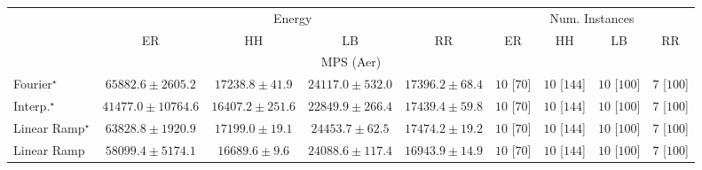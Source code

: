 \begin{tabular}{l|cccc|cccc|}
\toprule
& \multicolumn{4}{c|}{Energy} & \multicolumn{4}{c|}{Num. Instances} \\
            & ER & HH & LB & RR & ER & HH & LB & RR \\
\midrule
\multicolumn{9}{c}{\rule{0pt}{8pt}MPS (Aer)} \\
\midrule
Fourier$^\star$ & {\cellcolor[HTML]{84248A}} \color[HTML]{F1F1F1} $65882.6\pm 2605.2$ & {\cellcolor[HTML]{BED2E6}} \color[HTML]{000000} $17238.8\pm 41.9$ & {\cellcolor[HTML]{A8C3DE}} \color[HTML]{000000} $24117.0\pm 532.0$ & {\cellcolor[HTML]{BDD1E5}} \color[HTML]{000000} $17396.2\pm 68.4$ & {\cellcolor[HTML]{49006A}} \color[HTML]{F1F1F1} $10$ [$70$] & {\cellcolor[HTML]{49006A}} \color[HTML]{F1F1F1} $10$ [$144$] & {\cellcolor[HTML]{49006A}} \color[HTML]{F1F1F1} $10$ [$100$] & {\cellcolor[HTML]{FFF7F3}} \color[HTML]{000000} $7$ [$100$] \\
Interp.$^\star$ & {\cellcolor[HTML]{8C89C0}} \color[HTML]{F1F1F1} $41477.0\pm 10764.6$ & {\cellcolor[HTML]{C0D4E6}} \color[HTML]{000000} $16407.2\pm 251.6$ & {\cellcolor[HTML]{ACC6DF}} \color[HTML]{000000} $22849.9\pm 266.4$ & {\cellcolor[HTML]{BDD1E5}} \color[HTML]{000000} $17439.4\pm 59.8$ & {\cellcolor[HTML]{49006A}} \color[HTML]{F1F1F1} $10$ [$70$] & {\cellcolor[HTML]{49006A}} \color[HTML]{F1F1F1} $10$ [$144$] & {\cellcolor[HTML]{49006A}} \color[HTML]{F1F1F1} $10$ [$100$] & {\cellcolor[HTML]{FFF7F3}} \color[HTML]{000000} $7$ [$100$] \\
Linear Ramp$^\star$ & {\cellcolor[HTML]{852D90}} \color[HTML]{F1F1F1} $63828.8\pm 1920.9$ & {\cellcolor[HTML]{BED2E6}} \color[HTML]{000000} $17199.0\pm 19.1$ & {\cellcolor[HTML]{A7C2DD}} \color[HTML]{000000} $24453.7\pm 62.5$ & {\cellcolor[HTML]{BDD1E5}} \color[HTML]{000000} $17474.2\pm 19.2$ & {\cellcolor[HTML]{49006A}} \color[HTML]{F1F1F1} $10$ [$70$] & {\cellcolor[HTML]{49006A}} \color[HTML]{F1F1F1} $10$ [$144$] & {\cellcolor[HTML]{49006A}} \color[HTML]{F1F1F1} $10$ [$100$] & {\cellcolor[HTML]{FFF7F3}} \color[HTML]{000000} $7$ [$100$] \\
Linear Ramp & {\cellcolor[HTML]{8947A0}} \color[HTML]{F1F1F1} $58099.4\pm 5174.1$ & {\cellcolor[HTML]{BFD3E6}} \color[HTML]{000000} $16689.6\pm 9.6$ & {\cellcolor[HTML]{A8C3DE}} \color[HTML]{000000} $24088.6\pm 117.4$ & {\cellcolor[HTML]{BED2E6}} \color[HTML]{000000} $16943.9\pm 14.9$ & {\cellcolor[HTML]{49006A}} \color[HTML]{F1F1F1} $10$ [$70$] & {\cellcolor[HTML]{49006A}} \color[HTML]{F1F1F1} $10$ [$144$] & {\cellcolor[HTML]{49006A}} \color[HTML]{F1F1F1} $10$ [$100$] & {\cellcolor[HTML]{FFF7F3}} \color[HTML]{000000} $7$ [$100$] \\

\end{tabular}
